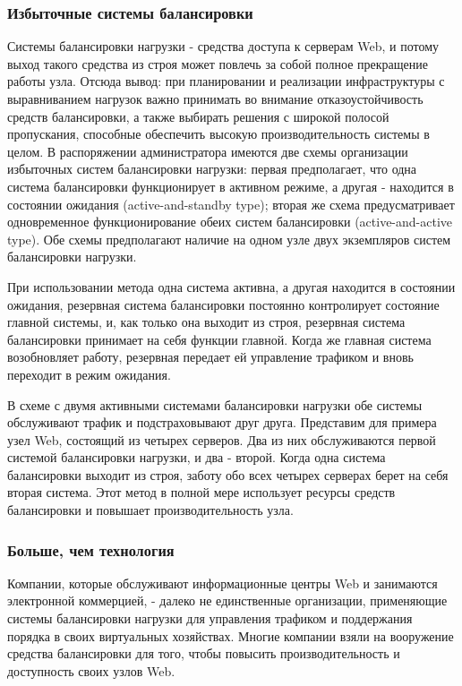 \subsubsection{Избыточные системы балансировки}

Системы балансировки нагрузки - средства доступа к серверам Web, и потому выход такого средства из строя может повлечь за собой полное прекращение работы узла. Отсюда вывод: при планировании и реализации инфраструктуры с выравниванием нагрузок важно принимать во внимание отказоустойчивость средств балансировки, а также выбирать решения с широкой полосой пропускания, способные обеспечить высокую производительность системы в целом. В распоряжении администратора имеются две схемы организации избыточных систем балансировки нагрузки: первая предполагает, что одна система балансировки функционирует в активном режиме, а другая - находится в состоянии ожидания (active-and-standby type); вторая же схема предусматривает одновременное функционирование обеих систем балансировки (active-and-active type). Обе схемы предполагают наличие на одном узле двух экземпляров систем балансировки нагрузки.

При использовании метода одна система активна, а другая находится в состоянии ожидания, резервная система балансировки постоянно контролирует состояние главной системы, и, как только она  выходит из строя,  резервная система балансировки принимает на себя функции главной. Когда же главная система возобновляет работу, резервная передает ей управление трафиком и вновь переходит в режим ожидания.

В схеме с двумя активными системами балансировки нагрузки обе системы обслуживают трафик и подстраховывают друг друга. Представим для примера узел Web, состоящий из четырех серверов. Два из них обслуживаются первой системой балансировки нагрузки, и два - второй. Когда одна система балансировки выходит из строя, заботу обо всех четырех серверах берет на себя вторая система. Этот метод в полной мере использует ресурсы средств балансировки и повышает производительность узла.

\subsubsection{Больше, чем технология}

Компании, которые обслуживают информационные центры Web и занимаются электронной коммерцией, - далеко не единственные организации, применяющие системы балансировки нагрузки для управления трафиком и поддержания порядка в своих виртуальных хозяйствах. Многие компании взяли на вооружение средства балансировки для того, чтобы повысить производительность и доступность своих узлов Web.

